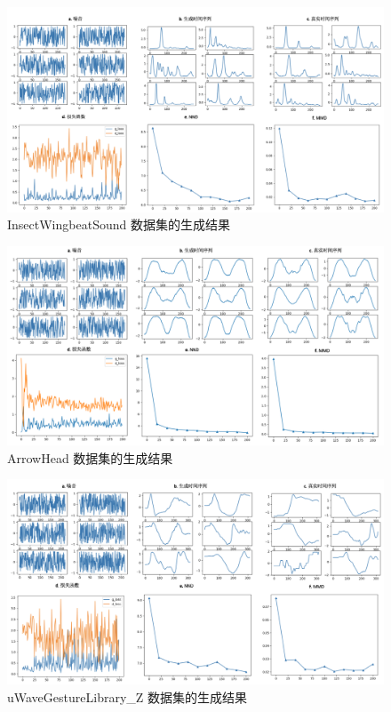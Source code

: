\begin{figure}[H]
\centering
\includegraphics[scale=0.5]{figures/gan/InsectWingbeatSound.png}
\caption{InsectWingbeatSound 数据集的生成结果}
\label{fig:gan-show-InsectWingbeatSound}
\end{figure}
\begin{figure}[H]
\centering
\includegraphics[scale=0.5]{figures/gan/ArrowHead.png}
\caption{ArrowHead 数据集的生成结果}
\label{fig:gan-show-ArrowHead}
\end{figure}
\begin{figure}[H]
\centering
\includegraphics[scale=0.5]{figures/gan/uWaveGestureLibrary_Z.png}
\caption{uWaveGestureLibrary\_Z 数据集的生成结果}
\label{fig:gan-show-uWaveGestureLibrary_Z}
\end{figure}
